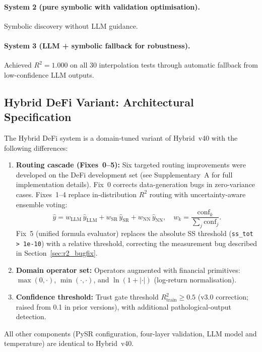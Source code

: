 \documentclass[twoside,11pt]{article}
\begin{document}
\paragraph{System 2 (pure symbolic with validation optimisation).}
Symbolic discovery without LLM guidance.

\paragraph{System 3 (LLM + symbolic fallback for robustness).}
Achieved $R^2 = 1.000$ on all 30 interpolation tests through automatic
fallback from low-confidence LLM outputs.

\subsection{Hybrid DeFi Variant: Architectural Specification}
\label{sec:hybrid_defi_spec}

The Hybrid DeFi system is a domain-tuned variant of Hybrid~v40 with the
following differences:

\begin{enumerate}
\item \textbf{Routing cascade (Fixes~0--5):} Six targeted routing improvements
  were developed on the DeFi development set (see Supplementary~A for full
  implementation details).  Fix~0 corrects data-generation bugs in zero-variance
  cases.  Fixes~1--4 replace in-distribution $R^2$ routing with uncertainty-aware
  ensemble voting:
  \[
    \hat{y} = w_\mathrm{LLM}\,\hat{y}_\mathrm{LLM}
             + w_\mathrm{SR}\,\hat{y}_\mathrm{SR}
             + w_\mathrm{NN}\,\hat{y}_\mathrm{NN},
    \quad w_k = \frac{\mathrm{conf}_k}{\sum_j \mathrm{conf}_j}.
  \]
  Fix~5 (unified formula evaluator) replaces the absolute SS threshold
  (\texttt{ss\_tot > 1e-10}) with a relative threshold, correcting the
  measurement bug described in Section~\ref{sec:r2_bugfix}.
\item \textbf{Domain operator set:} Operators augmented with financial
  primitives: $\max(0,\cdot)$, $\min(\cdot,\cdot)$, and
  $\ln(1+|\cdot|)$ (log-return normalisation).
\item \textbf{Confidence threshold:} Trust gate threshold $R^2_{\mathrm{train}} \geq 0.5$
  (v3.0 correction; raised from 0.1 in prior versions), with additional
  pathological-output detection.
\end{enumerate}

All other components (PySR configuration, four-layer validation, LLM model and
temperature) are identical to Hybrid~v40.
\end{document}
